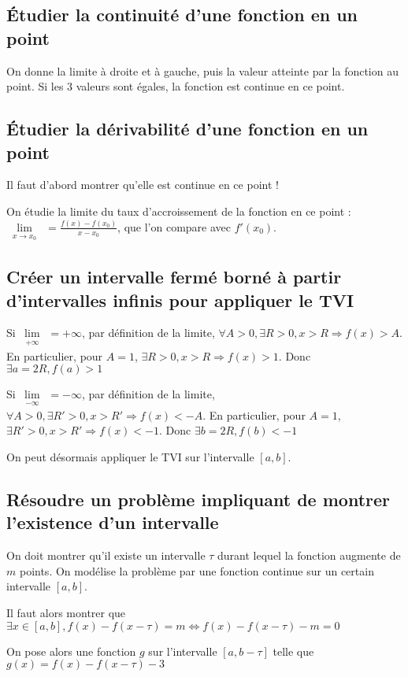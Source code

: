 \documentclass[french]{yLectureNote}
\newcommand{\Lim}[1]{\lim\limits_{\substack{#1}}\:}
\begin{document}
\subsection{Étudier la continuité d'une fonction en un point}
On donne la limite à droite et à gauche, puis la valeur atteinte par la fonction au point. Si les 3 valeurs sont égales, la fonction est continue en ce point.
\subsection{Étudier la dérivabilité d'une fonction en un point}
Il faut d'abord montrer qu'elle est continue en ce point !

On étudie la limite du taux d'accroissement de la fonction en ce point : $\Lim{x\to x_0} = \frac{f(x)-f(x_0)}{x-x_0}$, que l'on compare avec $f'(x_0)$.

\subsection{Créer un intervalle fermé borné à partir d'intervalles infinis pour appliquer le TVI}
Si $\Lim{+\infty} = + \infty$, par définition de la limite, $\forall A>0, \exists R>0, x>R \Rightarrow f(x)>A$. En particulier, pour $A = 1$, $\exists R>0, x>R \Rightarrow f(x)>1$. Donc $\exists a = 2R, f(a)>1$

Si $\Lim{-\infty} = - \infty$, par définition de la limite, $\forall A>0, \exists R'>0, x>R' \Rightarrow f(x)<-A$. En particulier, pour $A = 1$, $\exists R'>0, x>R' \Rightarrow f(x)<-1$. Donc $\exists b = 2R, f(b)<-1$

On peut désormais appliquer le TVI sur l'intervalle $[a,b]$.
\subsection{Résoudre un problème impliquant de montrer l'existence d'un intervalle}
On doit montrer qu'il existe un intervalle $\tau$ durant lequel la fonction augmente de $m$ points.
On modélise la problème par une fonction continue sur un certain intervalle $[a,b]$.

Il faut alors montrer que $\exists x\in [a,b], f(x)-f(x-\tau) = m \iff f(x)-f(x-\tau) -m =0$

On pose alors une fonction $g$ sur l'intervalle $[a,b-\tau]$ telle que $g(x) = f(x)-f(x-\tau)-3$
\end{document}
